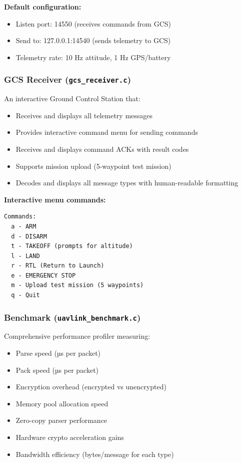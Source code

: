 \documentclass[11pt,a4paper]{article}
\begin{document}
\textbf{Default configuration:}
\begin{itemize}[noitemsep]
    \item Listen port: 14550 (receives commands from GCS)
    \item Send to: 127.0.0.1:14540 (sends telemetry to GCS)
    \item Telemetry rate: 10 Hz attitude, 1 Hz GPS/battery
\end{itemize}

\subsubsection{GCS Receiver (\texttt{gcs\_receiver.c})}

An interactive Ground Control Station that:
\begin{itemize}[noitemsep]
    \item Receives and displays all telemetry messages
    \item Provides interactive command menu for sending commands
    \item Receives and displays command ACKs with result codes
    \item Supports mission upload (5-waypoint test mission)
    \item Decodes and displays all message types with human-readable formatting
\end{itemize}

\textbf{Interactive menu commands:}
\begin{lstlisting}[language={}]
Commands:
  a - ARM
  d - DISARM
  t - TAKEOFF (prompts for altitude)
  l - LAND
  r - RTL (Return to Launch)
  e - EMERGENCY STOP
  m - Upload test mission (5 waypoints)
  q - Quit
\end{lstlisting}

\subsubsection{Benchmark (\texttt{uavlink\_benchmark.c})}

Comprehensive performance profiler measuring:
\begin{itemize}[noitemsep]
    \item Parse speed (µs per packet)
    \item Pack speed (µs per packet)
    \item Encryption overhead (encrypted vs unencrypted)
    \item Memory pool allocation speed
    \item Zero-copy parser performance
    \item Hardware crypto acceleration gains
    \item Bandwidth efficiency (bytes/message for each type)
\end{itemize}
\end{document}
